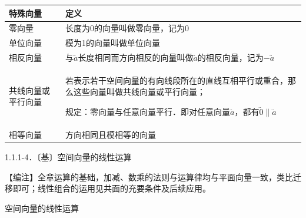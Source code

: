 {\def\LTcaptype{none} %
\begin{longtable}[]{@{}
  >{\raggedright\arraybackslash}p{}
  >{\raggedright\arraybackslash}p{}@{}}
\toprule\noalign{}
\begin{minipage}[b]{\linewidth}\raggedright
特殊向量
\end{minipage} & \begin{minipage}[b]{\linewidth}\raggedright
定义
\end{minipage} \\
\midrule\noalign{}
\endhead
\bottomrule\noalign{}
\endlastfoot
零向量 & 长度为0的向量叫做零向量，记为0 \\
单位向量 & 模为1的向量叫做单位向量 \\
相反向量 &
与\(\overset{⃑}{a}\)长度相同而方向相反的向量叫做\(\overset{⃑}{a}\)的相反向量，记为\(- \overset{⃑}{a}\) \\
共线向量或平行向量 &
若表示若干空间向量的有向线段所在的直线互相平行或重合，那么这些向量叫做共线向量或平行向量；

规定：零向量与任意向量平行．即对任意向量\(\overset{⃑}{a}\)，都有\(\overset{⃑}{0} \parallel \overset{⃑}{a}\) \\
相等向量 & 方向相同且模相等的向量 \\
\end{longtable}
}

1.1.1-4．〔基〕空间向量的线性运算

【⁠编⁠注⁠】全章运算的基础，加减、数乘的法则与运算律均与平面向量一致，类比迁移即可；线性组合的运用见共面的充要条件及后续应用。

空间向量的线性运算

